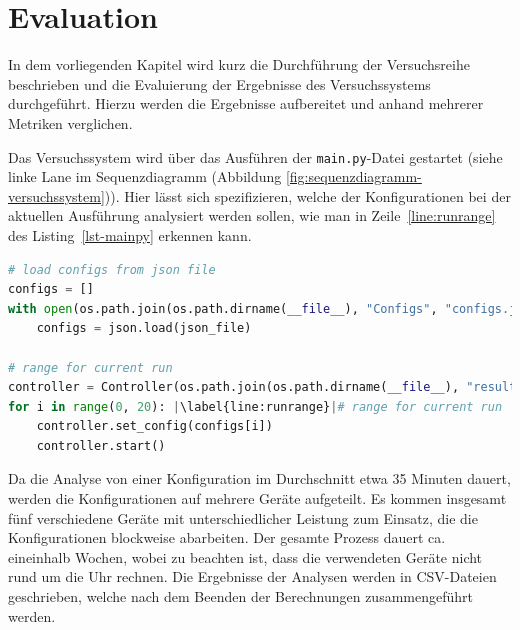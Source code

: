 \section{Evaluation} \label{sec:Evaluation}

In dem vorliegenden Kapitel wird kurz die Durchführung der Versuchsreihe beschrieben und die Evaluierung der Ergebnisse des Versuchssystems durchgeführt.
Hierzu werden die Ergebnisse aufbereitet und anhand mehrerer Metriken verglichen.

Das Versuchssystem wird über das Ausführen der \texttt{main.py}-Datei gestartet (siehe linke Lane im Sequenzdiagramm (Abbildung \ref{fig:sequenzdiagramm-versuchssystem})).
Hier lässt sich spezifizieren, welche der Konfigurationen bei der aktuellen Ausführung analysiert werden sollen, wie man in Zeile~\ref{line:runrange} des Listing~\ref{lst-mainpy} erkennen kann.

\begin{lstlisting}[language=Python,caption=Ausführen einer Versuchsreihe,label=lst-mainpy,escapechar=|]
# load configs from json file
configs = []
with open(os.path.join(os.path.dirname(__file__), "Configs", "configs.json"), "r") as json_file:
    configs = json.load(json_file)

# range for current run
controller = Controller(os.path.join(os.path.dirname(__file__), "results.csv"))
for i in range(0, 20): |\label{line:runrange}|# range for current run
    controller.set_config(configs[i])
    controller.start()
\end{lstlisting}

Da die Analyse von einer Konfiguration im Durchschnitt etwa 35 Minuten dauert, werden die Konfigurationen auf mehrere Geräte aufgeteilt. 
Es kommen insgesamt fünf verschiedene Geräte mit unterschiedlicher Leistung zum Einsatz, die die Konfigurationen blockweise abarbeiten.
Der gesamte Prozess dauert ca. eineinhalb Wochen, wobei zu beachten ist, dass die verwendeten Geräte nicht rund um die Uhr rechnen.
Die Ergebnisse der Analysen werden in CSV-Dateien geschrieben, welche nach dem Beenden der Berechnungen zusammengeführt werden.

\textauthor{\vJB}{}{}

